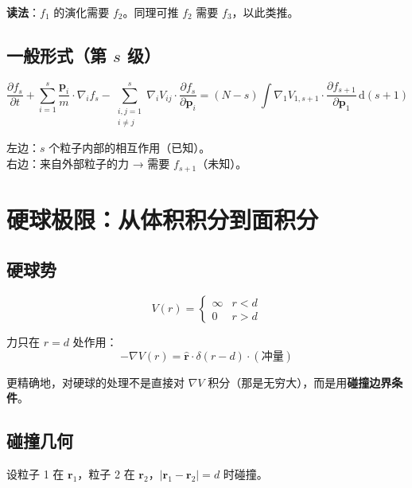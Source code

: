 \documentclass[11pt,a4paper]{article}
\newcommand{\ri}{\mathbf{r}}
\newcommand{\piu}{\mathbf{p}}
\begin{document}
\textbf{读法}：$f_1$ 的演化需要 $f_2$。同理可推 $f_2$ 需要 $f_3$，以此类推。

\subsection{一般形式（第 $s$ 级）}

\begin{equation}
\frac{\partial f_s}{\partial t} + \sum_{i=1}^s \frac{\piu_i}{m}\cdot\nabla_i f_s 
- \sum_{\substack{i,j=1\\i\neq j}}^s \nabla_i V_{ij}\cdot\frac{\partial f_s}{\partial\piu_i}
= (N-s)\int \nabla_1 V_{1,s+1}\cdot\frac{\partial f_{s+1}}{\partial\piu_1}\,\mathrm{d}(s{+}1)
\end{equation}

左边：$s$ 个粒子内部的相互作用（已知）。\\
右边：来自外部粒子的力 → 需要 $f_{s+1}$（未知）。

\section{硬球极限：从体积积分到面积分}

\subsection{硬球势}

\begin{equation}
V(r) = \begin{cases} \infty & r < d \\ 0 & r > d \end{cases}
\end{equation}

力只在 $r = d$ 处作用：
\begin{equation}
-\nabla V(r) = \hat{\mathbf{r}}\cdot\delta(r-d)\cdot(\text{冲量})
\end{equation}

更精确地，对硬球的处理不是直接对 $\nabla V$ 积分（那是无穷大），而是用\textbf{碰撞边界条件}。

\subsection{碰撞几何}

设粒子 1 在 $\ri_1$，粒子 2 在 $\ri_2$，$|\ri_1-\ri_2|=d$ 时碰撞。
\end{document}
